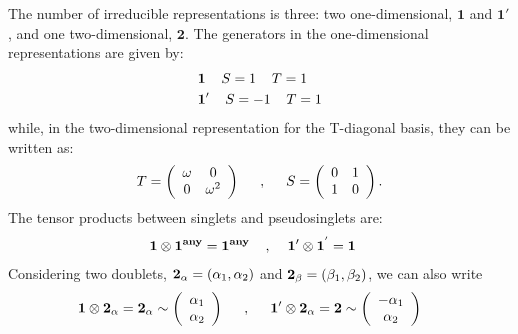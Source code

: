 \documentclass[a4paper,11pt]{article}
\begin{document}
The number of irreducible representations is three: two one-dimensional, $\mathbf{1}$ and $\mathbf{1'}$, and one two-dimensional, $\mathbf{2}$. The generators in the one-dimensional representations are given by:
\begin{equation}
\begin{split}
&\mathbf{1}\hspace{4mm}S=1 \hspace{4mm} T=1\\
&\mathbf{1'}\hspace{4mm}S=-1 \hspace{4mm} T=1\\
\end{split}
\end{equation}
while, in the two-dimensional representation for the T-diagonal basis, they can be written as:
\begin{equation}
T = \left(\begin{array}{cc} \omega & 0 \\ 0 & \omega^2 \\ \end{array}\right)\hspace{5mm},\hspace{5mm}
S = \left(\begin{array}{cc} 0 & 1 \\ 1 & 0 \\ \end{array}\right).
\end{equation}
The tensor products between singlets and pseudosinglets are:
\begin{equation}
\begin{split}
&\mathbf{1}\otimes\mathbf{1^{any}}=\mathbf{1^{any}}\hspace{4mm},\hspace{4mm}\mathbf{1'}\otimes\mathbf{1^{'}}=\mathbf{1}
\end{split}
\end{equation}
Considering two doublets, ${\bf 2}_\alpha=(\alpha_1,\alpha_2)$ and ${\bf 2}_\beta=(\beta_1,\beta_2)$, we can also write
\begin{equation}
\mathbf{1}\otimes\mathbf{2}_\alpha = \mathbf{2}_\alpha \sim \left(\begin{array}{c} \alpha_1 \\ \alpha_2\end{array}\right)\hspace{5mm},\hspace{5mm}
\mathbf{1'}\otimes\mathbf{2}_\alpha = \mathbf{2} \sim \left(\begin{array}{c} -\alpha_1 \\ \alpha_2 \end{array}\right)\hspace{5mm}
\end{equation}
\end{document}
